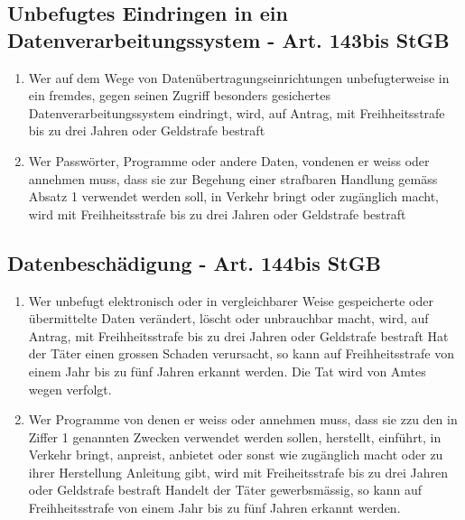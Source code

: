 \documentclass{report}
\theoremstyle{definition}
\theoremstyle{example}
\begin{document}
\subsection{Unbefugtes Eindringen in ein Datenverarbeitungssystem - Art. 143bis StGB}
\begin{enumerate}
   \item Wer auf dem Wege von Datenübertragungseinrichtungen unbefugterweise in ein fremdes, gegen seinen Zugriff besonders gesichertes Datenverarbeitungssystem eindringt, wird, auf Antrag, mit Freihheitsstrafe bis zu drei Jahren oder Geldstrafe bestraft
   \item Wer Passwörter, Programme oder andere Daten, vondenen er weiss oder annehmen muss, dass sie zur Begehung einer strafbaren Handlung gemäss Absatz 1 verwendet werden soll, in Verkehr bringt oder zugänglich macht, wird mit Freihheitsstrafe bis zu drei Jahren oder Geldstrafe bestraft
\end{enumerate}

\subsection{Datenbeschädigung - Art. 144bis StGB}
\begin{enumerate}
   \item Wer unbefugt elektronisch oder in vergleichbarer Weise gespeicherte oder übermittelte Daten verändert, löscht oder unbrauchbar macht, wird, auf Antrag, mit Freihheitsstrafe bis zu drei Jahren oder Geldstrafe bestraft
   \subitem Hat der Täter einen grossen Schaden verursacht, so kann auf Freihheitsstrafe von einem Jahr bis zu fünf Jahren erkannt werden. Die Tat wird von Amtes wegen verfolgt.
   \item Wer Programme von denen er weiss oder annehmen muss, dass sie zzu den in Ziffer 1 genannten Zwecken verwendet werden sollen, herstellt, einführt, in Verkehr bringt, anpreist, anbietet oder sonst wie zugänglich macht oder zu ihrer Herstellung Anleitung gibt, wird mit Freiheitsstrafe bis zu drei Jahren oder Geldstrafe bestraft
   \subitem Handelt der Täter gewerbsmässig, so kann auf Freihheitsstrafe von einem Jahr bis zu fünf Jahren erkannt werden.  
\end{enumerate}
\end{document}
